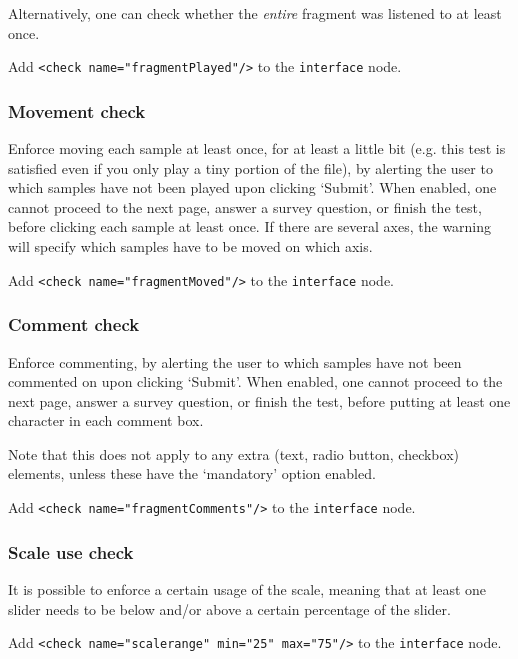 \documentclass[11pt, oneside]{article}   	%
\begin{document}
				Alternatively, one can check whether the \emph{entire} fragment was listened to at least once. 

				Add \texttt{<check name="fragmentPlayed"/>} to the \texttt{interface} node. 
				

		\subsubsection{Movement check}
			Enforce moving each sample at least once, for at least a little bit (e.g. this test is satisfied even if you only play a tiny portion of the file), by alerting the user to which samples have not been played upon clicking `Submit'. When enabled, one cannot proceed to the next page, answer a survey question, or finish the test, before clicking each sample at least once. 
			If there are several axes, the warning will specify which samples have to be moved on which axis.

			Add \texttt{<check name="fragmentMoved"/>} to the \texttt{interface} node.

		\subsubsection{Comment check}

			Enforce commenting, by alerting the user to which samples have not been commented on upon clicking `Submit'. When enabled, one cannot proceed to the next page, answer a survey question, or finish the test, before putting at least one character in each comment box. 

			Note that this does not apply to any extra (text, radio button, checkbox) elements, unless these have the `mandatory' option enabled. %

			Add \texttt{<check name="fragmentComments"/>} to the \texttt{interface} node. 


		\subsubsection{Scale use check}
			It is possible to enforce a certain usage of the scale, meaning that at least one slider needs to be below and/or above a certain percentage of the slider. 

			Add \texttt{<check name="scalerange" min="25" max="75"/>} to the \texttt{interface} node. 
\end{document}

